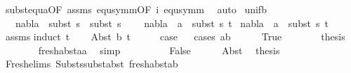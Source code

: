 \begin{isabellebody}
\ subst{\isacharunderscore}{\kern0pt}equ{\isacharunderscore}{\kern0pt}a{\isacharbrackleft}{\kern0pt}OF\ assms{\isacharparenleft}{\kern0pt}{}{\isacharparenright}{\kern0pt}\ equ{\isacharunderscore}{\kern0pt}symm{\isacharbrackleft}{\kern0pt}OF\ i{\isacharbrackright}{\kern0pt}{\isacharbrackright}{\kern0pt}\ equ{\isacharunderscore}{\kern0pt}symm\ \isamarkupfalse%
\ auto\isanewline
{}\isamarkupfalse%
%
\endisatagproof
{\isafoldproof}%
%
\isadelimproof
\isanewline
%
\endisadelimproof
\isanewline
{}\isamarkupfalse%
\ unif{\isacharunderscore}{\kern0pt}{}b{\isacharcolon}{\kern0pt}\isanewline
\ \ \ {\isachardoublequoteopen}nabla\ {\isasymTurnstile}\ subst\ s{}\ {\isasymapprox}\ subst\ s{}{\isachardoublequoteclose}\ \isanewline
\ \ \ {\isachardoublequoteopen}nabla\ {\isasymturnstile}\ a\ {\isasymsharp}\ subst\ s{}\ t{\isachardoublequoteclose}\isanewline
{}\ {\isachardoublequoteopen}nabla\ {\isasymturnstile}\ a\ {\isasymsharp}\ subst\ s{}\ t{\isachardoublequoteclose}\ \isanewline
%
\isadelimproof
\ \ %
\endisadelimproof
%
\isatagproof
{}\isamarkupfalse%
\ assms\isanewline
{}\isamarkupfalse%
{\isacharparenleft}{\kern0pt}induct\ t{\isacharparenright}{\kern0pt}\isanewline
\ \ \isamarkupfalse%
\ {\isacharparenleft}{\kern0pt}Abst\ b\ t{\isacharprime}{\kern0pt}{\isacharparenright}{\kern0pt}\isanewline
\ \ \isamarkupfalse%
\ \isamarkupfalse%
\ {\isacharquery}{\kern0pt}case\isanewline
\ \ \isamarkupfalse%
{\isacharparenleft}{\kern0pt}cases\ {\isachardoublequoteopen}a{\isacharequal}{\kern0pt}b{\isachardoublequoteclose}{\isacharparenright}{\kern0pt}\isanewline
\ \ \ \ \isamarkupfalse%
\ True\isanewline
\ \ \ \ \isamarkupfalse%
\ \isamarkupfalse%
\ {\isacharquery}{\kern0pt}thesis\ \isanewline
\ \ \ \ \ \ \isamarkupfalse%
\ fresh{\isacharunderscore}{\kern0pt}abst{\isacharunderscore}{\kern0pt}aa\ \isamarkupfalse%
\ simp\ \isanewline
\ \ \isamarkupfalse%
\isanewline
\ \ \ \ \isamarkupfalse%
\ False\isanewline
\ \ \ \ \isamarkupfalse%
\ Abst\ \isamarkupfalse%
\ {\isacharquery}{\kern0pt}thesis\ \isanewline
\ \ \ \ \ \ \isamarkupfalse%
\ Fresh{\isacharunderscore}{\kern0pt}elims{\isacharparenleft}{\kern0pt}{}{\isacharparenright}{\kern0pt}\ Substs{\isachardot}{\kern0pt}subst{\isacharunderscore}{\kern0pt}abst\ fresh{\isacharunderscore}{\kern0pt}abst{\isacharunderscore}{\kern0pt}ab\isanewline

\end{isabellebody}
